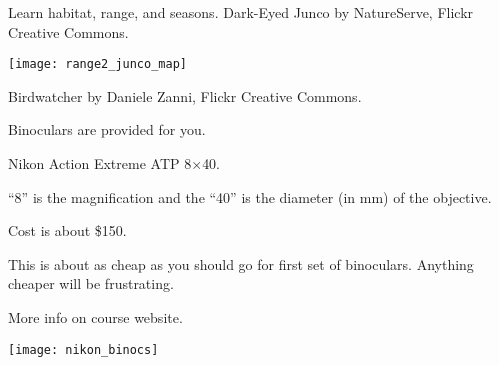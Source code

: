 \documentclass[t,handout]{beamer}  %
\begin{document}
{
\begin{frame}[b,plain]{Learn habitat, range, and seasons.}
	\tiny\hfill Dark-Eyed Junco by NatureServe, Flickr Creative Commons.
\end{frame}
}

\begin{frame}[b,plain]
	\begin{center}
		\texttt{[image: range2\_junco\_map]}
	\end{center}
\end{frame}

{
\begin{frame}[b,plain]
	\tiny Birdwatcher by Daniele Zanni, Flickr Creative Commons.
\end{frame}
}

{
\begin{frame}[t,plain]{Binoculars are provided for you.}


\begin{multicols}{2}
Nikon Action Extreme ATP 8$\times$40.

\smallskip

“8” is the magnification and the “40” is the diameter (in mm) of the objective.

\smallskip

Cost is about \$150.

\smallskip

This is about as cheap as you should go for first set of binoculars. Anything cheaper will be frustrating.

\smallskip

More info on course website.

\columnbreak

\texttt{[image: nikon\_binocs]}

\end{multicols}
%
%

\end{frame}
}
\end{document}
